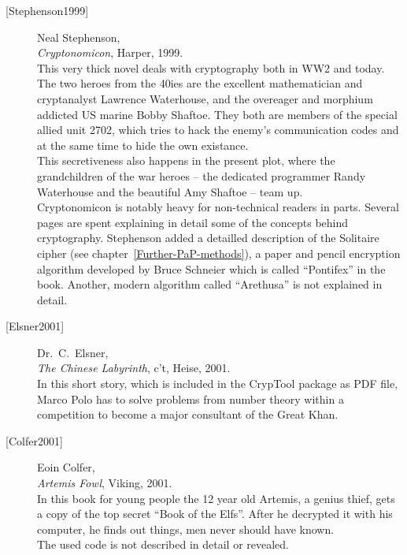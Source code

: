 \begin{description}
\item[\textrm{[Stephenson1999]}] 
    Neal Stephenson, \\
    {\em Cryptonomicon}, Harper, 1999. \\
    This very thick novel deals with cryptography both in WW2 and today.
    The two heroes from the 40ies are the excellent mathematician and
    cryptanalyst Lawrence Waterhouse, and the overeager and 
    morphium addicted US marine Bobby Shaftoe. 
    They both are members of the special allied unit 2702, which tries
    to hack the enemy's communication codes and at the same time to
    hide the own existance. \\
    This secretiveness also happens in the present plot, where the 
    grandchildren of the war heroes -- the dedicated programmer  
    Randy Waterhouse and the beautiful Amy Shaftoe -- team up. \\
    Cryptonomicon is notably heavy for non-technical readers in parts.
    Several pages are spent explaining in detail some of the concepts
    behind cryptography.
    Stephenson added a detailled description of the Solitaire cipher
    (see chapter~\ref{Further-PaP-methods}), a paper and pencil encryption
    algorithm developed by Bruce Schneier
    which is called ``Pontifex'' in the book. Another, modern algorithm
    called ``Arethusa'' is not explained in detail.\\


\item[\textrm{[Elsner2001]}] 
    Dr.~C.~Elsner, \\
    {\em The Chinese Labyrinth}, c't, Heise, 2001. \\
    In this short story, which is included in the CrypTool package
     as PDF file, Marco Polo has to solve problems from
    number theory within a competition to become a major consultant of
    the Great Khan.\\


\item[\textrm{[Colfer2001]}] 
    Eoin Colfer, \\
    {\em Artemis Fowl}, Viking, 2001. \\
    In this book for young people the 12 year old Artemis, a genius thief,
    gets a copy of the top secret ``Book of the Elfs''. After he decrypted it
    with his computer, he finds out things, men never should have known. \\
    The used code is not described in detail or revealed.\\



\end{description}
